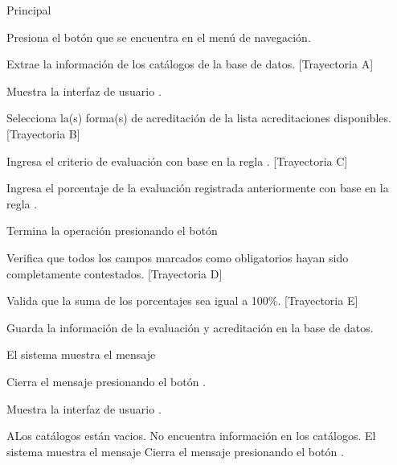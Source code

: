 \begin{UCtrayectoria}{Principal}

	\UCpaso[\UCactor] Presiona el botón  que se encuentra en el menú de navegación.
       
    \UCpaso Extrae la información de los catálogos de la base de datos. [Trayectoria A]
    
    \UCpaso Muestra la interfaz de usuario .

    \UCpaso[\UCactor] Selecciona la(s) forma(s) de acreditación de la lista acreditaciones disponibles. [Trayectoria B]
    
    \UCpaso[\UCactor] Ingresa el criterio de evaluación con base en la regla . [Trayectoria C]
    
    \UCpaso[\UCactor] Ingresa el porcentaje de la evaluación registrada anteriormente con base en la regla .
    
    \UCpaso[\UCactor] Termina la operación presionando el botón     
        
    \UCpaso Verifica que todos los campos marcados como obligatorios hayan sido completamente contestados. [Trayectoria D]
    
    \UCpaso Valida que la suma de los porcentajes sea igual a 100\%. [Trayectoria E]
    
    \UCpaso Guarda la información de la evaluación y acreditación en la base de datos.
    
    \UCpaso El sistema muestra el mensaje 
    
    \UCpaso[\UCactor] Cierra el mensaje presionando el botón .
    
    \UCpaso Muestra la interfaz de usuario .
\end{UCtrayectoria}


\begin{UCtrayectoriaA}{A}{Los catálogos están vacios.}
	\UCpaso No encuentra información en los catálogos.
    \UCpaso El sistema muestra el mensaje 
    \UCpaso[\UCactor] Cierra el mensaje presionando el botón .
\end{UCtrayectoriaA}

